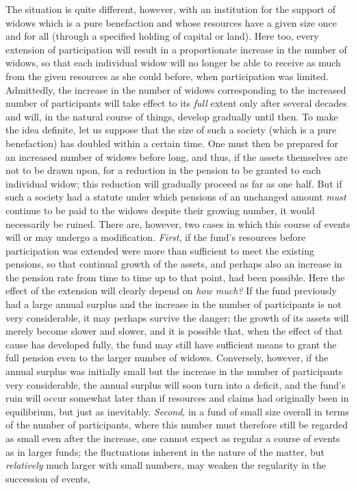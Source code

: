The situation is quite different, however, with an institution for the support of widows which is a pure benefaction and whose resources have a given size once and for all (through a specified holding of capital or land). Here too, every extension of participation will result in a proportionate increase in the number of widows, so that each individual widow will no longer be able to receive as much from the given resources as she could before, when participation was limited. Admittedly, the increase in the number of widows corresponding to the increased number of participants will take effect to its \textit{full} extent only after several decades and will, in the natural course of things, develop gradually until then. To make the idea definite, let us suppose that the size of such a society (which is a pure benefaction) has doubled within a certain time. One must then be prepared for an increased number of widows before long, and thus, if the assets themselves are not to be drawn upon, for a reduction in the pension to be granted to each individual widow; this reduction will gradually proceed as far as one half. But if such a society had a statute under which pensions of an unchanged amount \textit{must} continue to be paid to the widows despite their growing number, it would necessarily be ruined. There are, however, two cases in which this course of events will or may undergo a modification. \textit{First}, if the fund's resources before participation was extended were more than sufficient to meet the existing pensions, so that continual growth of the assets, and perhaps also an increase in the pension rate from time to time up to that point, had been possible. Here the effect of the extension will clearly depend on \textit{how much?} If the fund previously had a large annual surplus and the increase in the number of participants is not very considerable, it may perhaps survive the danger; the growth of its assets will merely become slower and slower, and it is possible that, when the effect of that cause has developed fully, the fund may still have sufficient means to grant the full pension even to the larger number of widows. Conversely, however, if the annual surplus was initially small but the increase in the number of participants very considerable, the annual surplus will soon turn into a deficit, and the fund's ruin will occur somewhat later than if resources and claims had originally been in equilibrium, but just as inevitably. \textit{Second}, in a fund of small size overall in terms of the number of participants, where this number must therefore still be regarded as small even after the increase, one cannot expect as regular a course of events as in larger funds; the fluctuations inherent in the nature of the matter, but \textit{relatively} much larger with small numbers, may weaken the regularity in the succession of events,
